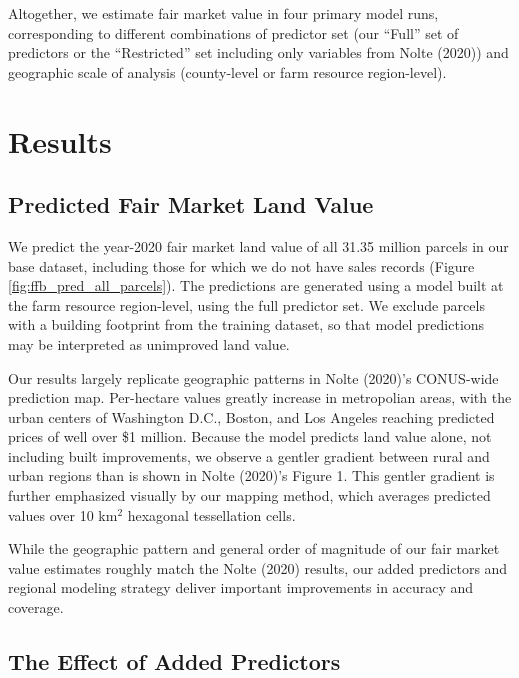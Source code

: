 \documentclass[12pt]{article}
\begin{document}
Altogether, we estimate fair market value in four primary model runs, corresponding to different combinations of predictor set (our ``Full'' set of predictors or the ``Restricted'' set including only variables from Nolte (2020)) and geographic scale of analysis (county-level or farm resource region-level). 

\section{Results}

\subsection{Predicted Fair Market Land Value}

We predict the year-2020 fair market land value of all 31.35 million parcels in our base dataset, including those for which we do not have sales records (Figure \ref{fig:ffb_pred_all_parcels}). The predictions are generated using a model built at the farm resource region-level, using the full predictor set. We exclude parcels with a building footprint from the training dataset, so that model predictions may be interpreted as unimproved land value.

Our results largely replicate geographic patterns in Nolte (2020)'s CONUS-wide prediction map. Per-hectare values greatly increase in metropolian areas, with the urban centers of Washington D.C., Boston, and Los Angeles reaching predicted prices of well over \$1 million. Because the model predicts land value alone, not including built improvements, we observe a gentler gradient between rural and urban regions than is shown in Nolte (2020)'s Figure 1. This gentler gradient is further emphasized visually by our mapping method, which averages predicted values over 10 km$^2$ hexagonal tessellation cells. 

While the geographic pattern and general order of magnitude of our fair market value estimates roughly match the Nolte (2020) results, our added predictors and regional modeling strategy deliver important improvements in accuracy and coverage. 

\subsection{The Effect of Added Predictors}
\end{document}
